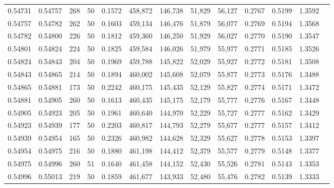 \begin{tabular}{rrrrrrrrrrrrr}
0.54731 & 0.54757 &   268 &  50 &                                     0.1572 & 458,872 & 146,738 &  51,829 &  56,127 & 0.2767 & 0.5199 & 1.3592 \\
0.54757 & 0.54782 &   262 &  50 &                                     0.1603 & 459,134 & 146,476 &  51,879 &  56,077 & 0.2769 & 0.5194 & 1.3568 \\
0.54782 & 0.54800 &   226 &  50 &                                     0.1812 & 459,360 & 146,250 &  51,929 &  56,027 & 0.2770 & 0.5190 & 1.3547 \\
0.54801 & 0.54824 &   224 &  50 &                                     0.1825 & 459,584 & 146,026 &  51,979 &  55,977 & 0.2771 & 0.5185 & 1.3526 \\
0.54824 & 0.54843 &   204 &  50 &                                     0.1969 & 459,788 & 145,822 &  52,029 &  55,927 & 0.2772 & 0.5181 & 1.3508 \\
0.54843 & 0.54865 &   214 &  50 &                                     0.1894 & 460,002 & 145,608 &  52,079 &  55,877 & 0.2773 & 0.5176 & 1.3488 \\
0.54865 & 0.54881 &   173 &  50 &                                     0.2242 & 460,175 & 145,435 &  52,129 &  55,827 & 0.2774 & 0.5171 & 1.3472 \\
0.54881 & 0.54905 &   260 &  50 &                                     0.1613 & 460,435 & 145,175 &  52,179 &  55,777 & 0.2776 & 0.5167 & 1.3448 \\
0.54905 & 0.54923 &   205 &  50 &                                     0.1961 & 460,640 & 144,970 &  52,229 &  55,727 & 0.2777 & 0.5162 & 1.3429 \\
0.54923 & 0.54939 &   177 &  50 &                                     0.2203 & 460,817 & 144,793 &  52,279 &  55,677 & 0.2777 & 0.5157 & 1.3412 \\
0.54939 & 0.54954 &   165 &  50 &                                     0.2326 & 460,982 & 144,628 &  52,329 &  55,627 & 0.2778 & 0.5153 & 1.3397 \\
0.54954 & 0.54975 &   216 &  50 &                                     0.1880 & 461,198 & 144,412 &  52,379 &  55,577 & 0.2779 & 0.5148 & 1.3377 \\
0.54975 & 0.54996 &   260 &  51 &                                     0.1640 & 461,458 & 144,152 &  52,430 &  55,526 & 0.2781 & 0.5143 & 1.3353 \\
0.54996 & 0.55013 &   219 &  50 &                                     0.1859 & 461,677 & 143,933 &  52,480 &  55,476 & 0.2782 & 0.5139 & 1.3333 \\

\end{tabular}
